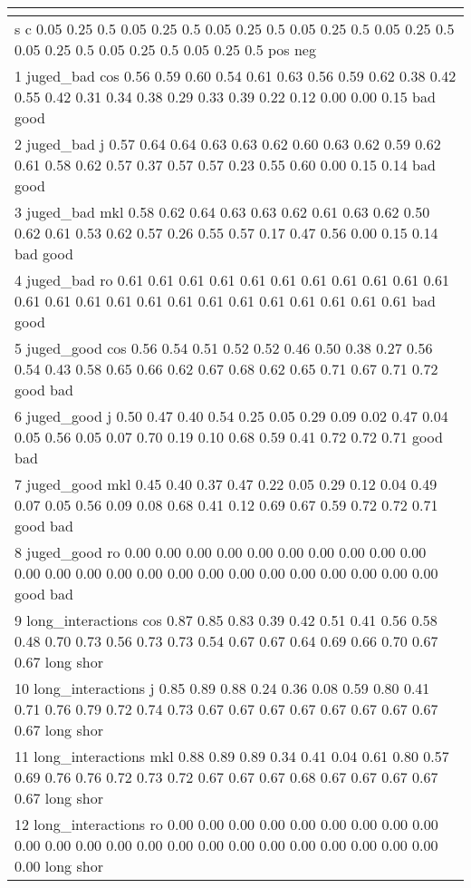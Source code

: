 \begin{table}[!tbp]
\begin{center}
\begin{tabular}{l}
\hline\hline
\multicolumn{1}{c}{}\tabularnewline
\hline
                          s   c 0.05 0.25  0.5 0.05 0.25  0.5 0.05 0.25  0.5 0.05 0.25  0.5 0.05 0.25  0.5 0.05 0.25  0.5 0.05 0.25  0.5 0.05 0.25  0.5       pos       neg\tabularnewline
1                 juged\_bad cos 0.56 0.59 0.60 0.54 0.61 0.63 0.56 0.59 0.62 0.38 0.42 0.55 0.42 0.31 0.34 0.38 0.29 0.33 0.39 0.22 0.12 0.00 0.00 0.15       bad      good\tabularnewline
2                 juged\_bad   j 0.57 0.64 0.64 0.63 0.63 0.62 0.60 0.63 0.62 0.59 0.62 0.61 0.58 0.62 0.57 0.37 0.57 0.57 0.23 0.55 0.60 0.00 0.15 0.14       bad      good\tabularnewline
3                 juged\_bad mkl 0.58 0.62 0.64 0.63 0.63 0.62 0.61 0.63 0.62 0.50 0.62 0.61 0.53 0.62 0.57 0.26 0.55 0.57 0.17 0.47 0.56 0.00 0.15 0.14       bad      good\tabularnewline
4                 juged\_bad  ro 0.61 0.61 0.61 0.61 0.61 0.61 0.61 0.61 0.61 0.61 0.61 0.61 0.61 0.61 0.61 0.61 0.61 0.61 0.61 0.61 0.61 0.61 0.61 0.61       bad      good\tabularnewline
5                juged\_good cos 0.56 0.54 0.51 0.52 0.52 0.46 0.50 0.38 0.27 0.56 0.54 0.43 0.58 0.65 0.66 0.62 0.67 0.68 0.62 0.65 0.71 0.67 0.71 0.72      good       bad\tabularnewline
6                juged\_good   j 0.50 0.47 0.40 0.54 0.25 0.05 0.29 0.09 0.02 0.47 0.04 0.05 0.56 0.05 0.07 0.70 0.19 0.10 0.68 0.59 0.41 0.72 0.72 0.71      good       bad\tabularnewline
7                juged\_good mkl 0.45 0.40 0.37 0.47 0.22 0.05 0.29 0.12 0.04 0.49 0.07 0.05 0.56 0.09 0.08 0.68 0.41 0.12 0.69 0.67 0.59 0.72 0.72 0.71      good       bad\tabularnewline
8                juged\_good  ro 0.00 0.00 0.00 0.00 0.00 0.00 0.00 0.00 0.00 0.00 0.00 0.00 0.00 0.00 0.00 0.00 0.00 0.00 0.00 0.00 0.00 0.00 0.00 0.00      good       bad\tabularnewline
9         long\_interactions cos 0.87 0.85 0.83 0.39 0.42 0.51 0.41 0.56 0.58 0.48 0.70 0.73 0.56 0.73 0.73 0.54 0.67 0.67 0.64 0.69 0.66 0.70 0.67 0.67      long      shor\tabularnewline
10        long\_interactions   j 0.85 0.89 0.88 0.24 0.36 0.08 0.59 0.80 0.41 0.71 0.76 0.79 0.72 0.74 0.73 0.67 0.67 0.67 0.67 0.67 0.67 0.67 0.67 0.67      long      shor\tabularnewline
11        long\_interactions mkl 0.88 0.89 0.89 0.34 0.41 0.04 0.61 0.80 0.57 0.69 0.76 0.76 0.72 0.73 0.72 0.67 0.67 0.67 0.68 0.67 0.67 0.67 0.67 0.67      long      shor\tabularnewline
12        long\_interactions  ro 0.00 0.00 0.00 0.00 0.00 0.00 0.00 0.00 0.00 0.00 0.00 0.00 0.00 0.00 0.00 0.00 0.00 0.00 0.00 0.00 0.00 0.00 0.00 0.00      long      shor\tabularnewline

\end{tabular}
\end{center}
\end{table}

